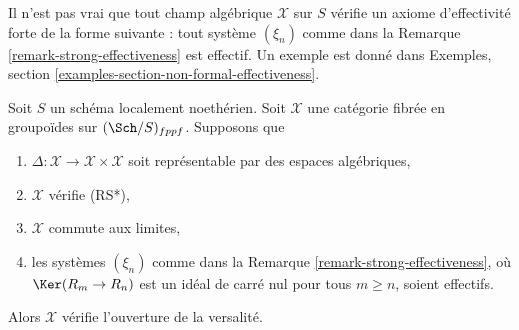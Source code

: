 \noindent
Il n'est pas vrai que tout champ algébrique $\mathcal{X}$
sur $S$ vérifie un axiome d'effectivité forte de la forme suivante :
tout système $(\xi_n)$ comme dans la Remarque \ref{remark-strong-effectiveness}
est effectif. Un exemple est donné dans
Exemples, section \ref{examples-section-non-formal-effectiveness}.

\begin{lemma}
\label{lemma-SGE-implies-openness-versality}
Soit $S$ un schéma localement noethérien. Soit $\mathcal{X}$ une catégorie fibrée
en groupoïdes sur $(\Sch/S)_{fppf}$. Supposons que
\begin{enumerate}
\item $\Delta : \mathcal{X} \to \mathcal{X} \times \mathcal{X}$ soit
représentable par des espaces algébriques,
\item $\mathcal{X}$ vérifie (RS*),
\item $\mathcal{X}$ commute aux limites,
\item les systèmes $(\xi_n)$ comme dans la Remarque \ref{remark-strong-effectiveness},
où $\Ker(R_m \to R_n)$ est un idéal de carré nul pour tous $m \geq n$,
soient effectifs.
\end{enumerate}
Alors $\mathcal{X}$ vérifie l'ouverture de la versalité.
\end{lemma}

